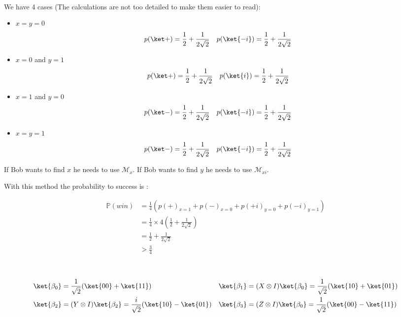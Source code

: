 ~

We have 4 cases (The calculations are not too detailed to make them easier to read):

\begin{itemize}
  \item $x = y = 0$
    \begin{align*}
      p(\ket +) &= \frac 1 2 + \frac 1 {2\sqrt 2} &
      p(\ket{-i}) &= \frac 1 2 + \frac 1 {2\sqrt 2}
    \end{align*}
  \item $x = 0$ and $y = 1$
    \begin{align*}
      p(\ket +) &= \frac 1 2 + \frac 1 {2\sqrt 2} &
      p(\ket{i}) &= \frac 1 2 + \frac 1 {2\sqrt 2}
    \end{align*}

  \item $x = 1$ and $y = 0$
    \begin{align*}
      p(\ket -) &= \frac 1 2 + \frac 1 {2\sqrt 2} &
      p(\ket{-i}) &= \frac 1 2 + \frac 1 {2\sqrt 2}
    \end{align*}

  \item $x = y = 1$
    \begin{align*}
      p(\ket -) &= \frac 1 2 + \frac 1 {2\sqrt 2} &
      p(\ket{-i}) &= \frac 1 2 + \frac 1 {2\sqrt 2}
    \end{align*}
\end{itemize}

If Bob wants to find $x$ he needs to use $\mathcal M_x$.
If Bob wants to find $y$ he needs to use $\mathcal M_{xi}$.

With this method the probability to success is : 

\begin{align*}
  \mathbb P(win) &= \frac 1 4(p(+)_{x=1} + p(-)_{x=0} + p(+i)_{y=0} + p(-i)_{y=1})
  \\
  &= \frac 1 4 \times 4 (\frac 1 2 + \frac 1 { 2 \sqrt 2}) \\
  &= \frac 1 2 + \frac 1 { 2 \sqrt 2} \\
  &> \frac 3 4
\end{align*}

~

\begin{align*}
  \ket{\beta_0} &= \frac{1}{\sqrt 2}(\ket{00} + \ket{11})
  &\ket{\beta_1} &= (X \otimes I)\ket{\beta_0} =
    \frac{1}{\sqrt 2}(\ket{10}+\ket{01}) \\
  \ket{\beta_2} &= (Y \otimes I)\ket{\beta_2} =
    \frac{i}{\sqrt 2}(\ket{10} - \ket{01})
  &\ket{\beta_3} &= (Z \otimes I)\ket{\beta_0} =
    \frac{1}{\sqrt 2}(\ket{00}-\ket{11})
\end{align*}

